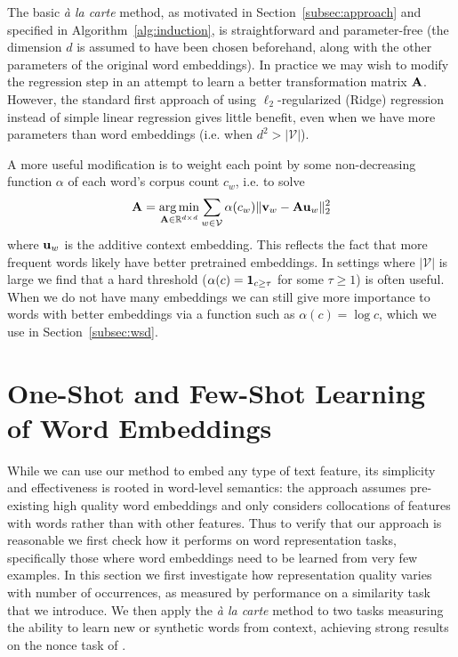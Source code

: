 \documentclass[11pt,a4paper]{article}
\DeclareMathOperator*{\argmin}{arg\,min}
\begin{document}
The basic {\em\`a la carte} method, as motivated in Section~\ref{subsec:approach} and specified in Algorithm~\ref{alg:induction}, is straightforward and parameter-free (the dimension $d$ is assumed to have been chosen beforehand, along with the other parameters of the original word embeddings).
In practice we may wish to modify the regression step in an attempt to learn a better transformation matrix ${\bf A}$.
However, the standard first approach of using $\ell_2$-regularized (Ridge) regression instead of simple linear regression gives little benefit, even when we have more parameters than word embeddings (i.e. when $d^2>|\mathcal{V}|$).

A more useful modification is to weight each point by some non-decreasing function $\alpha$ of each word's corpus count $c_w$, i.e. to solve
\begin{equation}\label{eq:weighted}
	{\bf A}=\argmin\limits_{{\bf A}\in\mathbb{R}^{d\times d}}\sum\limits_{w\in\mathcal{V}}\alpha(c_w)\|{\bf v}_w-{\bf Au}_w\|_2^2
\end{equation}
where ${\bf u}_w$ is the additive context embedding.
This reflects the fact that more frequent words likely have better pretrained embeddings.
In settings where $|\mathcal{V}|$ is large we find that a hard threshold ($\alpha(c)={\bf 1}_{c\ge\tau}$ for some $\tau\ge1$) is often useful.
When we do not have many embeddings we can still give more importance to words with better embeddings via a function such as $\alpha(c)=\log c$, which we use in Section~\ref{subsec:wsd}. 


\section{One-Shot and Few-Shot Learning of Word Embeddings}\label{sec:fewshot}

While we can use our method to embed any type of text feature, its simplicity and effectiveness is rooted in word-level semantics: the approach assumes pre-existing high quality word embeddings and only considers collocations of features with words rather than with other features.
Thus to verify that our approach is reasonable we first check how it performs on word representation tasks, specifically those where word embeddings need to be learned from very few examples.
In this section we first investigate how representation quality varies with number of occurrences, as measured by performance on a similarity task that we introduce.
We then apply the {\em\`a la carte} method to two tasks measuring the ability to learn new or synthetic words from context, achieving strong results on the nonce task of \citet{Herbelot:17}.
\end{document}
